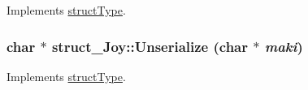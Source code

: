 Implements \hyperlink{classstructType_ac89681a3336b2fc76e65435238241db2}{structType}.

\hypertarget{classstruct__Joy_af683ec9dbedf3372b8ed17bff8c8b846}{
\subsubsection[{Unserialize}]{\setlength{\rightskip}{0pt plus 5cm}char $\ast$ struct\_\-Joy::Unserialize (char $\ast$ {\em maki})}}
\label{classstruct__Joy_af683ec9dbedf3372b8ed17bff8c8b846}


Implements \hyperlink{classstructType_ac89681a3336b2fc76e65435238241db2}{structType}.



